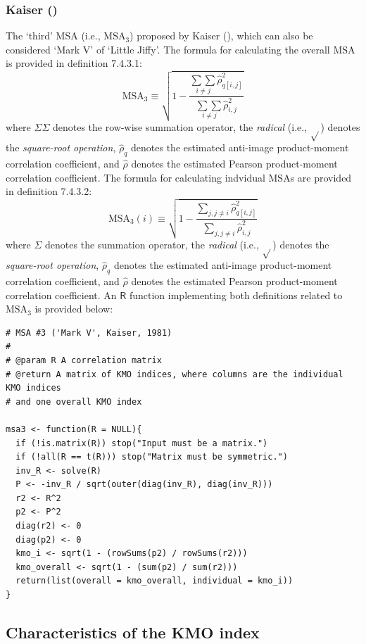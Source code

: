 \documentclass[
  10pt,
  a4paper,
  twoside]{article}
\begin{document}
\subsubsection{\texorpdfstring{Kaiser ()}{Kaiser (1981)}}\label{sec:sec_msa_kaiser1981_appendix}

The `third' MSA (i.e., \(\text{MSA}_3\)) proposed by Kaiser (), which can also be considered `Mark V' of `Little Jiffy'. The formula for calculating the overall MSA is provided in definition 7.4.3.1:
\[
\text{MSA}_3 \equiv \sqrt{ 1 - \frac{\underset{i \neq j}{\sum \sum} \hat{\rho}^2_{q[i,j]}}{\underset{i \neq j}{\sum \sum} \hat{\rho}^2_{i,j}}} \tag{7.4.3.1}
\]
where \(\Sigma \Sigma\) denotes the row-wise summation operator, the \emph{radical} (i.e., \(\sqrt{}\)) denotes the \emph{square-root operation}, \(\hat{\rho}_{q}\) denotes the estimated anti-image product-moment correlation coefficient, and \(\hat{\rho}\) denotes the estimated Pearson product-moment correlation coefficient. The formula for calculating indvidual MSAs are provided in definition 7.4.3.2:
\[
\text{MSA}_3(i) \equiv \sqrt{ 1 - \frac{
\sum_{j, j \neq i} \hat{\rho}^2_{q[i,j]}
}{
\sum_{j, j \neq i} \hat{\rho}^2_{i,j}
}}  \tag{7.4.3.2}
\]
where \(\Sigma\) denotes the summation operator, the \emph{radical} (i.e., \(\sqrt{}\)) denotes the \emph{square-root operation}, \(\hat{\rho}_{q}\) denotes the estimated anti-image product-moment correlation coefficient, and \(\hat{\rho}\) denotes the estimated Pearson product-moment correlation coefficient. An \(\textsf{R}\) function implementing both definitions related to \(\text{MSA}_3\) is provided below:

\begin{verbatim}
# MSA #3 ('Mark V', Kaiser, 1981)
#
# @param R A correlation matrix
# @return A matrix of KMO indices, where columns are the individual KMO indices
# and one overall KMO index

msa3 <- function(R = NULL){
  if (!is.matrix(R)) stop("Input must be a matrix.")
  if (!all(R == t(R))) stop("Matrix must be symmetric.")
  inv_R <- solve(R)
  P <- -inv_R / sqrt(outer(diag(inv_R), diag(inv_R)))
  r2 <- R^2
  p2 <- P^2
  diag(r2) <- 0
  diag(p2) <- 0
  kmo_i <- sqrt(1 - (rowSums(p2) / rowSums(r2)))
  kmo_overall <- sqrt(1 - (sum(p2) / sum(r2)))
  return(list(overall = kmo_overall, individual = kmo_i))
}
\end{verbatim}

\subsection{Characteristics of the KMO index}\label{sec:sec_monte_carlo_appendix}
\end{document}
